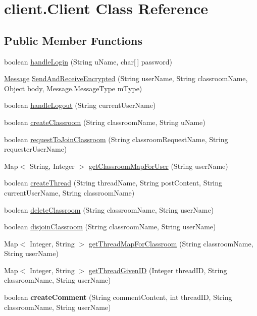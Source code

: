 \hypertarget{classclient_1_1_client}{
\section{client.\-Client \-Class \-Reference}
\label{classclient_1_1_client}
}
\subsection*{\-Public \-Member \-Functions}
\begin{DoxyCompactItemize}
\item 
boolean \hyperlink{classclient_1_1_client_ab39ffb797bfb6d99acf9eafc00c92bf8}{handle\-Login} (\-String u\-Name, char\mbox{[}$\,$\mbox{]} password)
\item 
\hyperlink{classstorage_1_1_message}{\-Message} \hyperlink{classclient_1_1_client_ac3aaba7fa6bba443db93590a357839d7}{\-Send\-And\-Receive\-Encrypted} (\-String user\-Name, \-String classroom\-Name, \-Object body, \-Message.\-Message\-Type m\-Type)
\item 
boolean \hyperlink{classclient_1_1_client_a0912a3d76ad777e48ffd24cdf6915757}{handle\-Logout} (\-String current\-User\-Name)
\item 
boolean \hyperlink{classclient_1_1_client_a8e34949fba6d37a57673776101ef3afe}{create\-Classroom} (\-String classroom\-Name, \-String u\-Name)
\item 
boolean \hyperlink{classclient_1_1_client_a2cbe1d0d394754db74305a623f2b9c98}{request\-To\-Join\-Classroom} (\-String classroom\-Request\-Name, \-String requester\-User\-Name)
\item 
\-Map$<$ \-String, \-Integer $>$ \hyperlink{classclient_1_1_client_a6db5b0635155ac32595526988455ed5a}{get\-Classroom\-Map\-For\-User} (\-String user\-Name)
\item 
boolean \hyperlink{classclient_1_1_client_aed505644ad018b883ede73d71e63dfd6}{create\-Thread} (\-String thread\-Name, \-String post\-Content, \-String current\-User\-Name, \-String classroom\-Name)
\item 
boolean \hyperlink{classclient_1_1_client_a29b39ba8090e63d3d67e994664cbccf6}{delete\-Classroom} (\-String classroom\-Name, \-String user\-Name)
\item 
boolean \hyperlink{classclient_1_1_client_adfa2846dd8aaeaf541e8ca9ef59670dc}{disjoin\-Classroom} (\-String classroom\-Name, \-String user\-Name)
\item 
\-Map$<$ \-Integer, \-String $>$ \hyperlink{classclient_1_1_client_a9457f8a445e5fa927700fe329560ee30}{get\-Thread\-Map\-For\-Classroom} (\-String classroom\-Name, \-String user\-Name)
\item 
\-Map$<$ \-Integer, \-String $>$ \hyperlink{classclient_1_1_client_a5c842770f1783756f15aeeae77671e10}{get\-Thread\-Given\-I\-D} (\-Integer thread\-I\-D, \-String classroom\-Name, \-String user\-Name)
\item 
\hypertarget{classclient_1_1_client_a9fc69a48eb8b0cea3a7fbc432a85ee8b}{
boolean {\bfseries create\-Comment} (\-String comment\-Content, int thread\-I\-D, \-String classroom\-Name, \-String user\-Name)}
\label{classclient_1_1_client_a9fc69a48eb8b0cea3a7fbc432a85ee8b}


\end{DoxyCompactItemize}
